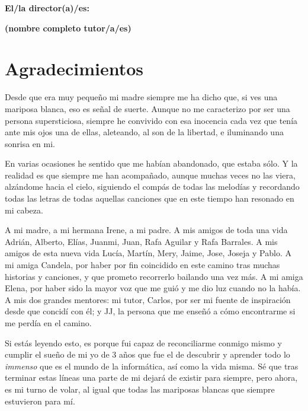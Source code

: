\vspace{1cm}

\textbf{El/la director(a)/es: }

\vspace{5cm}

\noindent \textbf{(nombre completo tutor/a/es)}

\chapter*{Agradecimientos}

Desde que era muy pequeño mi madre siempre me ha dicho que, si ves una mariposa blanca, eso es señal de suerte. Aunque no me caracterizo por ser una persona supersticiosa, siempre he convivido con esa inocencia cada vez que tenía ante mis ojos una de ellas, aleteando, al son de la libertad, e iluminando una sonrisa en mi.

\vspace{0.2cm}

En varias ocasiones he sentido que me habían abandonado, que estaba sólo. Y la realidad es que siempre me han acompañado, aunque muchas veces no las viera, alzándome hacia el cielo, siguiendo el compás de todas las melodías y recordando todas las letras de todas aquellas canciones que en este tiempo han resonado en mi cabeza.

\vspace{0.2cm} 

A mi madre, a mi hermana Irene, a mi padre. A mis amigos de toda una vida Adrián, Alberto, Elías, Juanmi, Juan, Rafa Aguilar y Rafa Barrales. A mis amigos de esta nueva vida Lucía, Martín, Mery, Jaime, Jose, Joseja y Pablo. A mi amiga Candela, por haber por fin coincidido en este camino tras muchas historias y canciones, y que prometo recorrerlo bailando una vez más. A mi amiga Elena, por haber sido la mayor voz que me guió y me dio luz cuando no la había. A mis dos grandes mentores: mi tutor, Carlos, por ser mi fuente de inspiración desde que concidí con él; y JJ, la persona que me enseñó a cómo encontrarme si me perdía en el camino.

\vspace{0.2cm}
Si estás leyendo esto, es porque fui capaz de reconciliarme conmigo mismo y cumplir el sueño de mi yo de 3 años que fue el de descubrir y aprender todo lo \textit{immenso} que es el mundo de la informática, así como la vida misma. Sé que tras terminar estas líneas una parte de mi dejará de existir para siempre, pero ahora, es mi turno de volar, al igual que todas las mariposas blancas que siempre estuvieron para mí.

